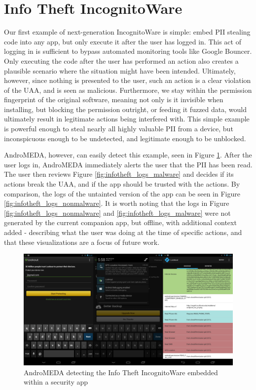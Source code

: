 \section{Info Theft IncognitoWare}
Our first example of next-generation IncognitoWare is simple: embed PII stealing code into any app, but only execute it after the user has logged in. This act of logging in is sufficient to bypass automated monitoring tools like Google Bouncer. Only executing the code after the user has performed an action also creates a plausible scenario where the situation might have been intended. Ultimately, however, since nothing is presented to the user, such an action is a clear violation of the UAA, and is seen as malicious. Furthermore, we stay within the permission fingerprint of the original software, meaning not only is it invisible when installing, but blocking the permission outright, or feeding it fuzzed data, would ultimately result in legitimate actions being interfered with. This simple example is powerful enough to steal nearly all highly valuable PII from a device, but inconspicuous enough to be undetected, and legitimate enough to be unblocked.

AndroMEDA, however, can easily detect this example, seen in Figure \ref{fig:infotheft_visual}. After the user logs in, AndroMEDA immediately alerts the user that the PII has been read. The user then reviews Figure \ref{fig:infotheft_logs_malware} and decides if its actions break the UAA, and if the app should be trusted with the actions. By comparison, the logs of the untainted version of the app can be seen in Figure \ref{fig:infotheft_logs_nonmalware}. It is worth noting that the logs in Figure \ref{fig:infotheft_logs_nonmalware} and \ref{fig:infotheft_logs_malware} were not generated by the current companion app, but offline, with additional context added - describing what the user was doing at the time of specific actions, and that these visualizations are a focus of future work.

\begin{figure}[h]
\begin{center}
\includegraphics[width=1.0\columnwidth]{figs/lookout_detection}
\caption{AndroMEDA detecting the Info Theft IncognitoWare embedded within a security app }
\label{fig:infotheft_visual}
\end{center}
\end{figure}


